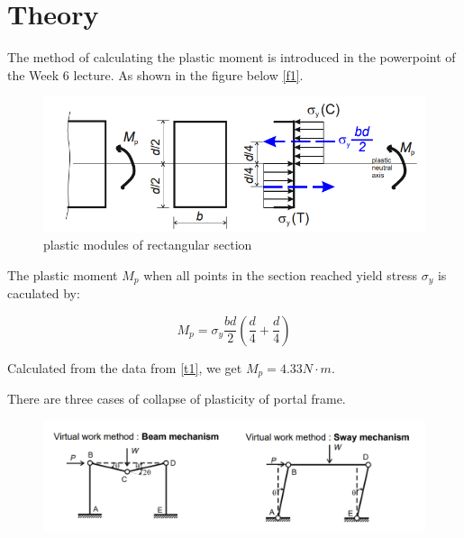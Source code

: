 \section{Theory}
\FloatBarrier %

The method of calculating the plastic moment is introduced in the powerpoint of the Week 6 lecture. As shown in the figure below \autoref{f1}.

\begin{figure}
    \centering
    \includegraphics[]{./fig/11.png}
    \caption{plastic modules of rectangular section  }
    \label{f1}
\end{figure}

The plastic moment $M_p$ when all points in the section reached
yield stress $\sigma_y$ is caculated by:

\begin{equation} 
    M_p=\sigma_y\frac{bd}{2}(\frac{d}{4}+\frac{d}{4})
\end{equation}

Calculated from the data from \autoref{t1}, we get $M_p=4.33N \cdot m$.

There are three cases of collapse of plasticity of portal frame.

\begin{figure}[htbp]
    \centering
    \includegraphics[width=15cm]{./fig/12.png}
    \label{f2}
\end{figure}




























